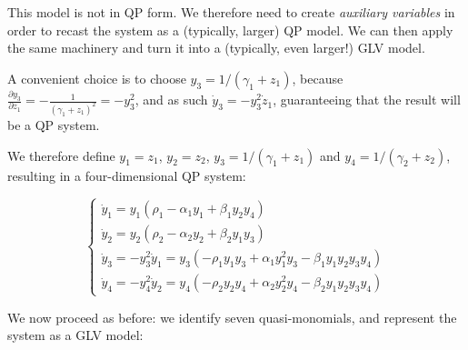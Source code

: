 \documentclass{article}
\begin{document}
This model is not in QP form. We therefore need to create
\emph{auxiliary variables} in order to recast the system as a
(typically, larger) QP model. We can then apply the same machinery and
turn it into a (typically, even larger!) GLV model.

A convenient choice is to choose \(y_3 = 1 / (\gamma_1 + z_1)\), because
\(\frac{\partial y_3}{\partial z_1} = - \frac{1}{(\gamma_1 + z_1)^2} = -y_3^2\),
and as such \(\dot{y}_3 = -y_3^2 \dot{z}_1\), guaranteeing that the
result will be a QP system.

We therefore define \(y_1 = z_1\), \(y_2 = z_2\),
\(y_3 = 1/(\gamma_1 + z_1)\) and \(y_4 = 1 / (\gamma_2 + z_2)\),
resulting in a four-dimensional QP system:

\begin{equation}
\begin{cases}
\dot{y}_1 = y_1 \left(\rho_1 - \alpha_1 y_1 + \beta_1 y_2 y_4 \right)\\
\dot{y}_2 = y_2 \left(\rho_2 - \alpha_2 y_2 + \beta_2 y_1 y_3 \right)\\
\dot{y}_3 = -y_3^2 \dot{y}_1 = y_3 (-\rho_1 y_1 y_3 + \alpha_1 y_1^2 y_3 - \beta_1 y_1 y_2 y_3 y_4)\\
\dot{y}_4 = -y_4^2 \dot{y}_2 = y_4 (-\rho_2 y_2 y_4 + \alpha_2 y_2^2 y_4 - \beta_2 y_1 y_2 y_3 y_4)
\end{cases}
\end{equation}

We now proceed as before: we identify seven quasi-monomials, and
represent the system as a GLV model:
\end{document}
